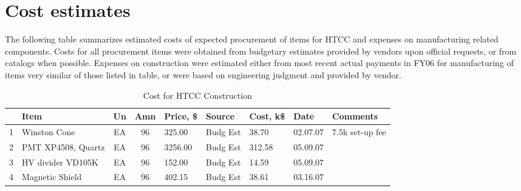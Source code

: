  
\section{Cost estimates}
\label{Cost}

The following table summarizes estimated costs of expected procurement of items for HTCC and expenses on manufacturing related components. Costs for all procurement items were obtained from budgetary estimates provided by vendors upon official requests, or from catalogs when possible.
Expenses on construction were estimated either from most recent actual payments in FY06 for manufacturing of items very similar of those listed in table, or were based on engineering judgment and provided by vendor. 




\begin{table}
\centering
\caption{Cost for HTCC Construction}
\label{HTCC}
\vspace{0.5cm}
\begin{tabular}{|c|p{3.7cm}|c|c|p{1.4cm}|p{1.6cm}|p{1.5cm}|p{1.2cm}|p{2.5cm}|}
\hline
 & {\footnotesize\bf Item} & {\footnotesize\bf Un} & {\footnotesize\bf Amn} & {\footnotesize\bf Price, \$} & {\footnotesize\bf Source} & {\footnotesize\bf Cost, k\$}& {\footnotesize\bf Date} & {\footnotesize\bf Comments} \\ \hline

{\footnotesize 1} & {\footnotesize Winston Cone} & {\footnotesize EA} & {\footnotesize 96} & {\footnotesize 325.00} & {\footnotesize Budg Est} & {\footnotesize 38.70} & {\footnotesize 02.07.07} & {\footnotesize 7.5k set-up fee}\\ \hline

{\footnotesize 2} & {\footnotesize PMT XP4508, Quartz} & {\footnotesize EA} & {\footnotesize 96} & {\footnotesize 3256.00} & {\footnotesize Budg Est} & {\footnotesize 312.58} & {\footnotesize 05.09.07} & {\footnotesize }\\ \hline

{\footnotesize 3} & {\footnotesize HV divider VD105K} & {\footnotesize EA} & {\footnotesize 96} & {\footnotesize 152.00} & {\footnotesize Budg Est} & {\footnotesize 14.59} & {\footnotesize 05.09.07} & {\footnotesize }\\ \hline

{\footnotesize 4} & {\footnotesize Magnetic Shield} & {\footnotesize EA} & {\footnotesize 96} & {\footnotesize 402.15} & {\footnotesize Budg Est} & {\footnotesize 38.61} & {\footnotesize 03.16.07} & {\footnotesize }\\ \hline



\end{tabular}
\end{table}
